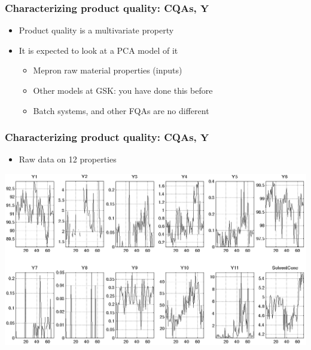 \begin{frame}\frametitle{Characterizing product quality: CQAs, \( \mathbf{Y}\)}

\begin{itemize}
	\item	Product quality is a multivariate property
	
	\item	It is expected to look at a PCA model of it
	
		\begin{itemize}
			\item	Mepron raw material properties (inputs)

			\item	Other models at GSK: you have done this before
			
			\item	Batch systems, and other FQAs are no different
		\end{itemize}
\end{itemize}

\end{frame}

\begin{frame}\frametitle{Characterizing product quality: CQAs, \( \mathbf{Y}\)}

\begin{itemize}
	\item	Raw data on 12 properties
\end{itemize}

\begin{center}
	\includegraphics[width=\textwidth]{images/fmc/fmc-Z-raw-data.png}
\end{center}

\end{frame}

